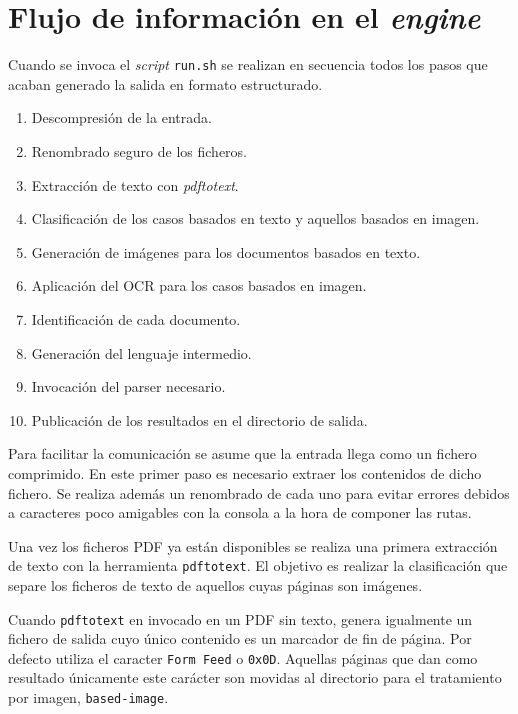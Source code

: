 
\section{Flujo de información en el \emph{engine}}

Cuando se invoca el \emph{script} \verb|run.sh| se realizan en secuencia todos los pasos que acaban generado la salida en formato estructurado.

\begin{enumerate}
    \item Descompresión de la entrada.
    \item Renombrado seguro de los ficheros.
    \item Extracción de texto con \emph{pdftotext}.
    \item Clasificación de los casos basados en texto y aquellos basados en imagen.
    \item Generación de imágenes para los documentos basados en texto.
    \item Aplicación del OCR para los casos basados en imagen.
    \item Identificación de cada documento.
    \item Generación del lenguaje intermedio.
    \item Invocación del parser necesario.
    \item Publicación de los resultados en el directorio de salida.
\end{enumerate}

Para facilitar la comunicación se asume que la entrada llega  como un fichero comprimido. En este primer paso es necesario extraer los contenidos de dicho fichero. Se realiza además un renombrado de cada uno para evitar errores debidos a caracteres poco amigables con la consola a la hora de componer las rutas.

Una vez los ficheros PDF ya están disponibles se realiza una primera extracción de texto con la herramienta \verb|pdftotext|. El objetivo es realizar la clasificación que separe los ficheros de texto de aquellos cuyas páginas son imágenes.

Cuando \verb|pdftotext| en invocado en un PDF sin texto, genera igualmente un fichero de salida cuyo único contenido es un marcador de fin de página. Por defecto utiliza el caracter \verb|Form Feed| o \verb|0x0D|. Aquellas páginas que dan como resultado únicamente este carácter son movidas al directorio para el tratamiento por imagen, \verb|based-image|.

